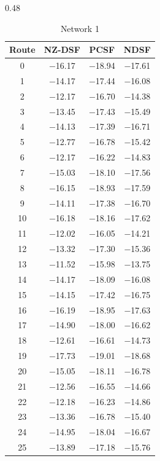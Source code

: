 \documentclass[12pt,a4paper]{article}
\begin{document}
\begin{table}[H]
\centering
\caption{Route NSR (dB) by fiber type.}
\label{tab:nsr}
\begin{subtable}[t]{0.48\textwidth}
\centering
\caption{Network 1}
\begin{tabular}{cccc}
\toprule
Route & NZ-DSF & PCSF & NDSF \\
\midrule
0  & $-$16.17 & $-$18.94 & $-$17.61 \\
1  & $-$14.17 & $-$17.44 & $-$16.08 \\
2  & $-$12.17 & $-$16.70 & $-$14.38 \\
3  & $-$13.45 & $-$17.43 & $-$15.49 \\
4  & $-$14.13 & $-$17.39 & $-$16.71 \\
5  & $-$12.77 & $-$16.78 & $-$15.42 \\
6  & $-$12.17 & $-$16.22 & $-$14.83 \\
7  & $-$15.03 & $-$18.10 & $-$17.56 \\
8  & $-$16.15 & $-$18.93 & $-$17.59 \\
9  & $-$14.11 & $-$17.38 & $-$16.70 \\
10 & $-$16.18 & $-$18.16 & $-$17.62 \\
11 & $-$12.02 & $-$16.05 & $-$14.21 \\
12 & $-$13.32 & $-$17.30 & $-$15.36 \\
13 & $-$11.52 & $-$15.98 & $-$13.75 \\
14 & $-$14.17 & $-$18.09 & $-$16.08 \\
15 & $-$14.15 & $-$17.42 & $-$16.75 \\
16 & $-$16.19 & $-$18.95 & $-$17.63 \\
17 & $-$14.90 & $-$18.00 & $-$16.62 \\
18 & $-$12.61 & $-$16.61 & $-$14.73 \\
19 & $-$17.73 & $-$19.01 & $-$18.68 \\
20 & $-$15.05 & $-$18.11 & $-$16.78 \\
21 & $-$12.56 & $-$16.55 & $-$14.66 \\
22 & $-$12.18 & $-$16.23 & $-$14.86 \\
23 & $-$13.36 & $-$16.78 & $-$15.40 \\
24 & $-$14.95 & $-$18.04 & $-$16.67 \\
25 & $-$13.89 & $-$17.18 & $-$15.76 \\

\end{tabular}
\end{subtable}
\end{table}
\end{document}
